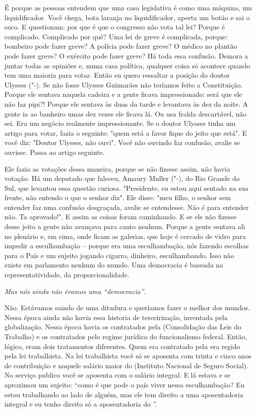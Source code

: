 É porque as pessoas entendem que uma casa legislativa
é como uma máquina, um liquidificador. Você chega, bota laranja no
liquidificador, aperta um botão e sai o suco. E questionam: por que é
que o congresso não vota tal lei? Porque é complicado. Complicado por
quê? Uma lei de greve é complicada, porque: bombeiro pode fazer greve? A
polícia pode fazer greve? O médico no plantão pode fazer greve? O
exército pode fazer greve? Há toda essa confusão. Demora a juntar todas
as opiniões e, numa casa política, qualquer coisa só acontece quando tem
uma maioria para votar. Então eu quero ressaltar a posição do doutor
Ulysses ("-). Se não fosse Ulysses Guimarães não teríamos feito a
Constituição. Porque ele sentava naquela cadeira e a gente ficava
impressionado: será que ele não faz pipi?! Porque ele sentava às duas da
tarde e levantava às dez da noite. A gente ia ao banheiro umas dez vezes
ele ficava lá. Ou usa fralda descartável, não sei. Era um negócio
realmente impressionante. Se o doutor Ulysses tinha um artigo para
votar, fazia o seguinte: "quem está a favor fique do jeito que está". E
você diz: "Doutor Ulysses, não ouvi". Você não ouvindo faz confusão,
avalie se ouvisse. Passa ao artigo seguinte.

Ele fazia as votações dessa maneira, porque se não fizesse assim, não
havia votação. Há um deputado que faleceu, Amaury Muller ("-), do
Rio Grande do Sul, que levantou essa questão curiosa. "Presidente, eu
estou aqui sentado na sua frente, não entendo o que o senhor diz". Ele
disse: "meu filho, o senhor sem entender faz uma confusão desgraçada,
avalie se entendesse. Não é para entender não. Ta aprovado!". E assim as
coisas foram caminhando. E se ele não fizesse desse jeito a gente não
avançava para canto nenhum. Porque a gente sentava ali no plenário e, em
cima, onde ficam as galerias, que hoje é cercado de vidro para impedir a
esculhambação -- porque era uma esculhambação, nós fazendo escolhas para
o País e um sujeito jogando cigarro, dinheiro, esculhambando. Isso não
existe em parlamento nenhum do mundo. Uma democracia é baseada na
representatividade, da proporcionalidade.

\medskip

\noindent\emph{Mas nós ainda não éramos uma ``democracia''}.

Não. Estávamos saindo de uma ditadura e queríamos
fazer o melhor dos mundos. Nessa época ainda não havia essa historia de
terceirização, inventada pela globalização. Nessa época havia os
contratados pela  (Consolidação das Leis do Trabalho) e os
contratados pelo regime jurídico do funcionalismo federal. Então,
lógico, eram dois tratamentos diferentes. Quem era contratado pela 
era regido pela lei trabalhista. Na lei trabalhista você só se aposenta
com trinta e cinco anos de contribuição e naquele salário maior do 
(Instituto Nacional de Seguro Social). No serviço publico você se
aposenta com o salário integral. E lá estava e se aproximou um sujeito:
``como é que pode o país viver nessa esculhambação? Eu estou trabalhando
ao lado de alguém, mas ele tem direito a uma aposentadoria integral e eu
tenho direito só a aposentadoria do ''.

